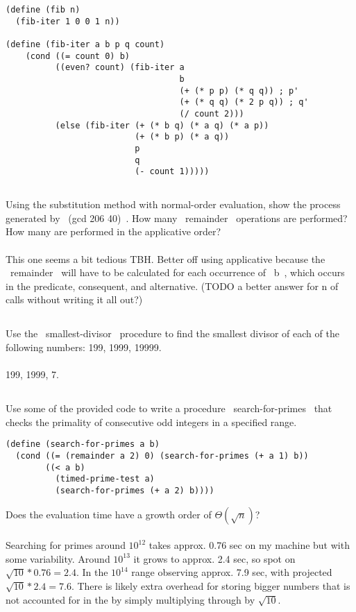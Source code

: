 \documentclass{article}
\begin{document}
\pagebreak
\begin{lstlisting}
(define (fib n)
  (fib-iter 1 0 0 1 n))

(define (fib-iter a b p q count)
    (cond ((= count 0) b)
          ((even? count) (fib-iter a
                                   b
                                   (+ (* p p) (* q q)) ; p'
                                   (+ (* q q) (* 2 p q)) ; q'
                                   (/ count 2)))
          (else (fib-iter (+ (* b q) (* a q) (* a p))
                          (+ (* b p) (* a q))
                          p
                          q
                          (- count 1)))))
\end{lstlisting}
\subsection{}
Using the substitution method with normal-order evaluation, show the process generated by ~(gcd 206 40)~. How many ~remainder~ operations are performed? How many are performed in the applicative order?\\ \\
This one seems a bit tedious TBH. Better off using applicative because the ~remainder~ will have to be calculated for each occurrence of ~b~, which occurs in the predicate, consequent, and alternative. (TODO a better answer for n of calls without writing it all out?)

\subsection{}
Use the ~smallest-divisor~ procedure to find the smallest divisor of each of the following numbers: 199, 1999, 19999.\\ \\
199, 1999, 7.

\pagebreak
\subsection{}
Use some of the provided code to write a procedure ~search-for-primes~ that checks the primality of consecutive odd integers in a specified range.
\begin{lstlisting}
(define (search-for-primes a b)
  (cond ((= (remainder a 2) 0) (search-for-primes (+ a 1) b))
        ((< a b)
          (timed-prime-test a)
          (search-for-primes (+ a 2) b))))
\end{lstlisting}
Does the evaluation time have a growth order of $\Theta(\sqrt{n})$?\\ \\
Searching for primes around $10^{12}$ takes approx. 0.76 sec on my machine but with some variability. Around $10^{13}$ it grows to approx. 2.4 sec, so spot on $\sqrt{10} * 0.76 = 2.4$. In the $10^{14}$ range observing approx. 7.9 sec, with projected $\sqrt{10} * 2.4 = 7.6$. There is likely extra overhead for storing bigger numbers that is not accounted for in the by simply multiplying through by $\sqrt{10}$.
\end{document}
